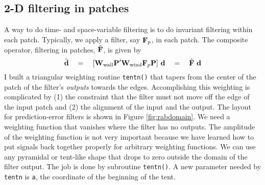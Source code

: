 \subsection{2-D filtering in patches}
A way to do time- and space-variable filtering
is to do invariant filtering within each patch.
Typically, we apply a filter, say $\bold F_p$, in each patch.
The composite operator, filtering in patches,
$\tilde{\bold F}$,
is given by
\begin{equation}
\tilde {\bf d}
\quad = \quad 
[ \bold W_{\rm wall} \bold P' \bold W_{\rm wind} \bold F_p \bold P ]\  \bold d
\quad = \quad 
\tilde{\bold F}
\ \bold d
\label{eqn:patchfilt}
\end{equation}
I built a triangular weighting routine
\texttt{tentn()}
that tapers from the center of the patch of the filter's {\it outputs}
towards the edges.
Accomplishing this weighting is complicated by
(1) the constraint
that the filter must not move off the edge of the input patch
and
(2) the alignment of the input and the output.
The layout for prediction-error filters is shown
in Figure \ref{fig:rabdomain}.
We need a weighting function that vanishes where the filter
has no outputs.
The amplitude of the weighting function is not very important
because we have learned how to put signals back together
properly for arbitrary weighting functions.
We can use any pyramidal or tent-like shape
that drops to zero outside the domain of the filter output.
The job is done by subroutine {\tt tentn()}.
A new parameter needed by \texttt{tentn}
is \texttt{a}, the coordinate of the beginning of the tent.

